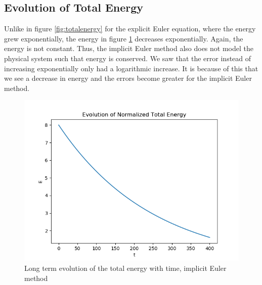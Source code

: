 \documentclass{article}
\begin{document}
\subsection{Evolution of Total Energy}
Unlike in figure \ref{fig:totalenergy} for the explicit Euler equation, where the energy grew exponentially, the energy in figure \ref{fig:totalenergyimp} decreases exponentially. Again, the energy is not constant. Thus, the implicit Euler method also does not model the physical system such that energy is conserved. We saw that the error instead of increasing exponentially only had a logarithmic increase. It is because of this that we see a decrease in energy and the errors become greater for the implicit Euler method.
\begin{figure}[h]
    \centering
    \includegraphics[width = \textwidth]{Images/totalenergyimp.png}
    \caption{Long term evolution of the total energy with time, implicit Euler method}
    \label{fig:totalenergyimp}
\end{figure}
\end{document}
